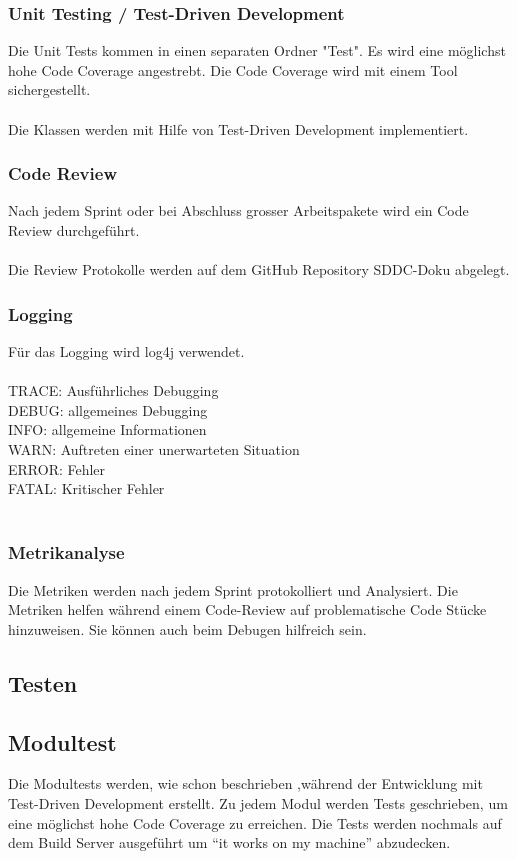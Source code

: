 \documentclass[11pt]{scrartcl}
\begin{document}
\subsubsection{Unit Testing / Test-Driven Development}
Die Unit Tests kommen in einen separaten Ordner "Test".
Es wird eine möglichst hohe Code Coverage angestrebt.
Die Code Coverage wird mit einem Tool sichergestellt.\\
\\
Die Klassen werden mit Hilfe von Test-Driven Development implementiert.

\subsubsection{Code Review}
Nach jedem Sprint oder bei Abschluss grosser Arbeitspakete wird ein Code Review durchgeführt.\\
\\
Die Review Protokolle werden auf dem GitHub Repository SDDC-Doku abgelegt.

\subsubsection{Logging}
Für das Logging wird log4j verwendet.\\
\\
TRACE: Ausführliches Debugging\\
DEBUG: allgemeines Debugging\\
INFO: allgemeine Informationen\\
WARN: Auftreten einer unerwarteten Situation\\
ERROR: Fehler\\
FATAL: Kritischer Fehler\\
\\

\subsubsection{Metrikanalyse}
Die Metriken werden nach jedem Sprint protokolliert und Analysiert. 
Die Metriken helfen während einem Code-Review auf problematische 
Code Stücke hinzuweisen. Sie können auch beim Debugen hilfreich sein.


\subsection{Testen}

\subsection{Modultest}
Die Modultests werden, wie schon beschrieben ,während der Entwicklung mit Test-Driven Development erstellt.
Zu jedem Modul werden Tests geschrieben, um eine möglichst hohe Code 
Coverage zu erreichen.
Die Tests werden nochmals auf dem Build Server ausgeführt um ``it 
works on my machine'' abzudecken.\\
\end{document}
